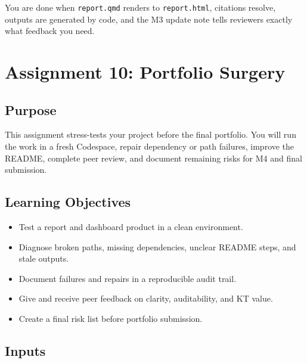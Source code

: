 \documentclass[
  letterpaper,
  DIV=11,
  numbers=noendperiod,
  oneside]{scrreprt}
\providecommand{\tightlist}{%
  \setlength{\itemsep}{0pt}\setlength{\parskip}{0pt}}
\begin{document}
You are done when \texttt{report.qmd} renders to \texttt{report.html},
citations resolve, outputs are generated by code, and the M3 update note
tells reviewers exactly what feedback you need.

\chapter{Assignment 10: Portfolio
Surgery}\label{assignment-10-portfolio-surgery}

\section{Purpose}\label{purpose-12}

This assignment stress-tests your project before the final portfolio.
You will run the work in a fresh Codespace, repair dependency or path
failures, improve the README, complete peer review, and document
remaining risks for M4 and final submission.

\section{Learning Objectives}\label{learning-objectives-11}

\begin{itemize}
\tightlist
\item
  Test a report and dashboard product in a clean environment.
\item
  Diagnose broken paths, missing dependencies, unclear README steps, and
  stale outputs.
\item
  Document failures and repairs in a reproducible audit trail.
\item
  Give and receive peer feedback on clarity, auditability, and KT value.
\item
  Create a final risk list before portfolio submission.
\end{itemize}

\section{Inputs}\label{inputs-11}
\end{document}
